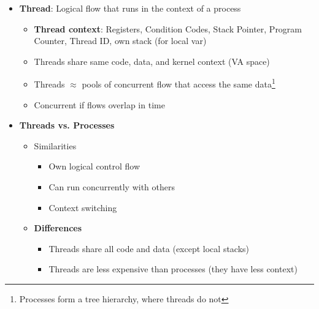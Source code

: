\documentclass[12pt]{article}
\begin{document}
{\begin{itemize}
\begin{itemize}
\begin{itemize}
			\item One logical control flow and shared address space
			\item Can single step with debugger
			\item No process or thread control overhead
			\item Gives programmers more control over the behavior
		\end{itemize}
		\item Cons
		\begin{itemize}
			\item Too complex
			\item Hard to provide fine-grained concurrency
			\item Cannot take advantage of multi-core (single control)
		\end{itemize}
	\end{itemize}
	\item \textbf{Thread}: Logical flow that runs in the context of a process
	\begin{itemize}
		\item \textbf{Thread context}: Registers, Condition Codes, Stack Pointer, Program Counter, Thread ID, own stack (for local var)
		\item Threads share same code, data, and kernel context (VA space)
		\item Threads $\approx$ pools of concurrent flow that access the same data\footnote{Processes form a tree hierarchy, where threads do not}
		\item Concurrent if flows overlap in time
	\end{itemize}
	\item \textbf{Threads vs. Processes}
	\begin{itemize}
		\item Similarities
		\begin{itemize}
			\item Own logical control flow
			\item Can run concurrently with others
			\item Context switching
		\end{itemize}
		\item \textbf{Differences}
		\begin{itemize}
			\item Threads share all code and data (except local stacks)
			\item Threads are less expensive than processes (they have less context)
		\end{itemize}

\end{itemize}
\end{itemize}}
\end{document}
